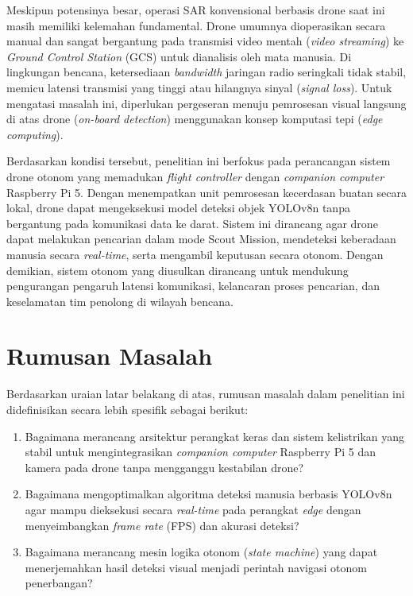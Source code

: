 Meskipun potensinya besar, operasi SAR konvensional berbasis drone saat ini masih memiliki kelemahan fundamental. Drone umumnya dioperasikan secara manual dan sangat bergantung pada transmisi video mentah (\textit{video streaming}) ke \textit{Ground Control Station} (GCS) untuk dianalisis oleh mata manusia. Di lingkungan bencana, ketersediaan \textit{bandwidth} jaringan radio seringkali tidak stabil, memicu latensi transmisi yang tinggi atau hilangnya sinyal (\textit{signal loss}). Untuk mengatasi masalah ini, diperlukan pergeseran menuju pemrosesan visual langsung di atas drone (\textit{on-board detection}) menggunakan konsep komputasi tepi (\textit{edge computing}).

Berdasarkan kondisi tersebut, penelitian ini berfokus pada perancangan sistem drone otonom yang memadukan \textit{flight controller} dengan \textit{companion computer} Raspberry Pi 5. Dengan menempatkan unit pemrosesan kecerdasan buatan secara lokal, drone dapat mengeksekusi model deteksi objek YOLOv8n tanpa bergantung pada komunikasi data ke darat. Sistem ini dirancang agar drone dapat melakukan pencarian dalam mode Scout Mission, mendeteksi keberadaan manusia secara \textit{real-time}, serta mengambil keputusan secara otonom. Dengan demikian, sistem otonom yang diusulkan dirancang untuk mendukung pengurangan pengaruh latensi komunikasi, kelancaran proses pencarian, dan keselamatan tim penolong di wilayah bencana.

\section{Rumusan Masalah}
Berdasarkan uraian latar belakang di atas, rumusan masalah dalam penelitian ini didefinisikan secara lebih spesifik sebagai berikut:
\begin{enumerate}
	\item Bagaimana merancang arsitektur perangkat keras dan sistem kelistrikan yang stabil untuk mengintegrasikan \textit{companion computer} Raspberry Pi 5 dan kamera pada drone tanpa mengganggu kestabilan drone?
	\item Bagaimana mengoptimalkan algoritma deteksi manusia berbasis YOLOv8n agar mampu dieksekusi secara \textit{real-time} pada perangkat \textit{edge} dengan menyeimbangkan \textit{frame rate} (FPS) dan akurasi deteksi?
	\item Bagaimana merancang mesin logika otonom (\textit{state machine}) yang dapat menerjemahkan hasil deteksi visual menjadi perintah navigasi otonom penerbangan?
\end{enumerate}

